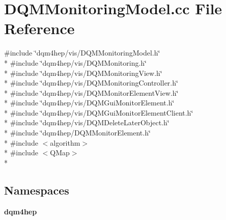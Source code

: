\section{D\+Q\+M\+Monitoring\+Model.\+cc File Reference}
\label{DQMMonitoringModel_8cc}
{\ttfamily \#include \char`\"{}dqm4hep/vis/\+D\+Q\+M\+Monitoring\+Model.\+h\char`\"{}}\\*
{\ttfamily \#include \char`\"{}dqm4hep/vis/\+D\+Q\+M\+Monitoring.\+h\char`\"{}}\\*
{\ttfamily \#include \char`\"{}dqm4hep/vis/\+D\+Q\+M\+Monitoring\+View.\+h\char`\"{}}\\*
{\ttfamily \#include \char`\"{}dqm4hep/vis/\+D\+Q\+M\+Monitoring\+Controller.\+h\char`\"{}}\\*
{\ttfamily \#include \char`\"{}dqm4hep/vis/\+D\+Q\+M\+Monitor\+Element\+View.\+h\char`\"{}}\\*
{\ttfamily \#include \char`\"{}dqm4hep/vis/\+D\+Q\+M\+Gui\+Monitor\+Element.\+h\char`\"{}}\\*
{\ttfamily \#include \char`\"{}dqm4hep/vis/\+D\+Q\+M\+Gui\+Monitor\+Element\+Client.\+h\char`\"{}}\\*
{\ttfamily \#include \char`\"{}dqm4hep/vis/\+D\+Q\+M\+Delete\+Later\+Object.\+h\char`\"{}}\\*
{\ttfamily \#include \char`\"{}dqm4hep/\+D\+Q\+M\+Monitor\+Element.\+h\char`\"{}}\\*
{\ttfamily \#include $<$algorithm$>$}\\*
{\ttfamily \#include $<$Q\+Map$>$}\\*
\subsection*{Namespaces}
\begin{DoxyCompactItemize}
\item 
 {\bf dqm4hep}
\end{DoxyCompactItemize}
